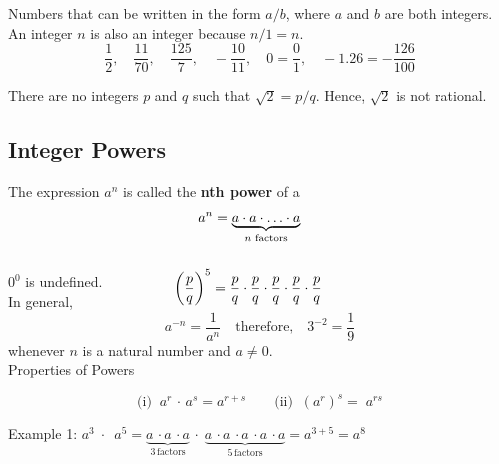 \documentclass[12pt]{article}
\begin{document}
\normalsize
Numbers that can be written in the form $a/b$, where $a$ and $b$ are both integers. An integer $n$ is also an integer because $n/1 = n$.
\begin{equation*}
    \frac{1}{2}, \quad \frac{11}{70}, \quad \frac{125}{7}, \quad -\frac{10}{11}, \quad 0=\frac{0}{1}, \quad -1.26=-\frac{126}{100}
\end{equation*}

There are no integers $p$ and $q$ such that $\sqrt{2} = p/q$. Hence, $\sqrt{2}$ is not rational.

\subsection{Integer Powers}

The expression $a^n$ is called the \textbf{nth power} of a
\begin{align*}
    &a^n = \underbrace{a \cdot a \cdot \ldots \cdot a}_{n \text{ factors}}\\[15pt]
    &\hspace{-19pt}\left(\frac{p}{q}\right)^5= \frac{p}{q} \cdot \frac{p}{q} \cdot \frac{p}{q} \cdot \frac{p}{q} \cdot \frac{p}{q}\\[-30pt]
\end{align*}
$0^0$ is undefined. \\
In general, 
\begin{equation*}
    a^{-n}= \frac{1}{a^n} \quad \text{therefore,} \quad 3^{-2}= \frac{1}{9}
\end{equation*}
whenever $n$ is a natural number and $a \neq 0$. \\
\large Properties of Powers \vspace{-15pt}


\normalsize 
\begin{equation*}
    \text{(i)} \; \; a^r \, \cdot \, a^s = a^{r+s} \quad \quad \text{(ii)} \; \; (a^r)^s = \; a^{rs}
\end{equation*}

Example 1: $a^3 \;  \cdot \;\ a^5 = \underbrace{a \, \cdot a \, \cdot a}_{3 \, \text{factors}} \, \cdot \; \underbrace{a \, \cdot a \, \cdot a \, \cdot a \, \cdot a}_{5 \, \text{factors}} = a^{3+5}=a^8$
\end{document}
